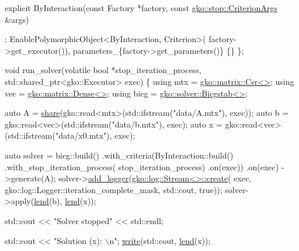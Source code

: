 \begin{DoxyCodeInclude}
    \textcolor{keyword}{explicit} ByInteraction(\textcolor{keyword}{const} Factory *factory,
                           \textcolor{keyword}{const} \hyperlink{structgko_1_1stop_1_1CriterionArgs}{gko::stop::CriterionArgs} &args)

        : EnablePolymorphicObject<ByInteraction, Criterion>(
              factory->get\_executor()),
          parameters\_\{factory->get\_parameters()\}
    \{\}
\};


\textcolor{keywordtype}{void} run\_solver(\textcolor{keyword}{volatile} \textcolor{keywordtype}{bool} *stop\_iteration\_process,
                std::shared\_ptr<gko::Executor> exec)
\{
    \textcolor{keyword}{using} mtx = \hyperlink{classgko_1_1matrix_1_1Csr}{gko::matrix::Csr<>};
    \textcolor{keyword}{using} vec = \hyperlink{classgko_1_1matrix_1_1Dense}{gko::matrix::Dense<>};
    \textcolor{keyword}{using} bicg = \hyperlink{classgko_1_1solver_1_1Bicgstab}{gko::solver::Bicgstab<>};

    \textcolor{keyword}{auto} A = \hyperlink{namespacegko_a3ce296f73db0ff398bdea6009a3a5c58}{share}(gko::read<mtx>(std::ifstream(\textcolor{stringliteral}{"data/A.mtx"}), exec));
    \textcolor{keyword}{auto} b = gko::read<vec>(std::ifstream(\textcolor{stringliteral}{"data/b.mtx"}), exec);
    \textcolor{keyword}{auto} x = gko::read<vec>(std::ifstream(\textcolor{stringliteral}{"data/x0.mtx"}), exec);

    \textcolor{keyword}{auto} solver = bicg::build()
                      .with\_criteria(ByInteraction::build()
                                         .with\_stop\_iteration\_process(
                                             stop\_iteration\_process)
                                         .on(exec))
                      .on(exec)
                      ->generate(A);
    solver->\hyperlink{classgko_1_1log_1_1EnableLogging_a7b3493c14a37b4d46487d9c636d784f2}{add\_logger}(\hyperlink{classgko_1_1log_1_1Stream}{gko::log::Stream<>::create}(
        exec, gko::log::Logger::iteration\_complete\_mask, std::cout, \textcolor{keyword}{true}));
    solver->apply(\hyperlink{namespacegko_aa8cb4876b72e5e1036ea9575443c439b}{lend}(b), \hyperlink{namespacegko_aa8cb4876b72e5e1036ea9575443c439b}{lend}(x));

    std::cout << \textcolor{stringliteral}{"Solver stopped"} << std::endl;

    std::cout << \textcolor{stringliteral}{"Solution (x): \(\backslash\)n"};
    \hyperlink{namespacegko_a859dc47a462721d83728d91ab7fa2148}{write}(std::cout, \hyperlink{namespacegko_aa8cb4876b72e5e1036ea9575443c439b}{lend}(x));


\end{DoxyCodeInclude}
